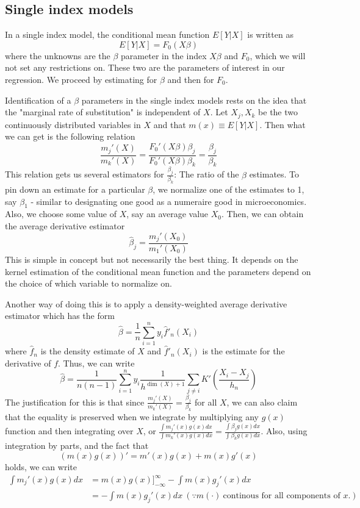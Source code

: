 \documentclass[12pt]{article}
\theoremstyle{definition}
\theoremstyle{property}
\theoremstyle{assumption}
\theoremstyle{example}
\theoremstyle{comment}
\begin{document}
\subsection{Single index models}
In a single index model, the conditional mean function $E[Y|X]$ is written as
\[
E[Y|X]=F_0(X\beta)
\]
where the unknowns are the $\beta$ parameter in the index $X\beta$ and $F_0$, which we will not set any restrictions on. These two are the parameters of interest in our regression. We proceed by estimating for $\beta$ and then for $F_0$. 
\par
Identification of a $\beta$ parameters in the single index models rests on the idea that the "marginal rate of substitution" is independent of $X$. Let $X_j,X_k$ be the two continuously distributed variables in $X$ and that $m(x)\equiv E[Y|X]$. Then what we can get is the following relation
\[
\frac{m_j'(X)}{m_k'(X)} = \frac{F_0'(X\beta)\beta_j}{F_0'(X\beta)\beta_k}=\frac{\beta_j}{\beta_k}
\]
This relation gets us several estimators for $\frac{\beta_j}{\beta_k}$: The ratio of the $\beta$ estimates. To pin down an estimate for a particular $\beta$, we normalize one of the estimates to 1, say $\beta_1$ - similar to designating one good as a numeraire good in microeconomics. Also, we choose some value of $X$, say an average value $X_0$. Then, we can obtain the average derivative estimator
\[
\hat{\beta}_j = \frac{m_j'(X_0)}{m_1'(X_0)}
\]
This is simple in concept but not necessarily the best thing. It depends on the kernel estimation of the conditional mean function and the parameters depend on the choice of which variable to normalize on.
\par
Another way of doing this is to apply a density-weighted average derivative estimator which has the form
\[
\hat{\beta} = \frac{1}{n}\sum_{i=1}^n y_i\hat{f}'_n(X_i)
\]
where $\hat{f}_n$ is the density estimate of $X$ and $\hat{f}'_n(X_i)$ is the estimate for the derivative of $f$. Thus, we can write 
\[
\hat{\beta} = \frac{1}{n(n-1)}\sum_{i=1}^n y_i\frac{1}{h^{\dim(X)+1}} \sum_{j\neq i}K'\left(\frac{X_i-X_j}{h_n}\right)
\]
The justification for this is that since $\frac{m_j'(X)}{m_k'(X)} =\frac{\beta_j}{\beta_k}$ for all $X$, we can also claim that the equality is preserved when we integrate by multiplying any $g(x)$ function and then integrating over $X$, or $\frac{\int m_j'(x)g(x)dx}{\int m_k'(x)g(x)dx}=\frac{\int \beta_jg(x)dx}{\int \beta_kg(x)dx}$. Also, using integration by parts, and the fact that 
\[
(m(x)g(x))'=m'(x)g(x)+m(x)g'(x)
\]
holds, we can write
\[
\begin{aligned}
\int m_j'(x)g(x) dx &= m(x)g(x)]^{\infty}_{-\infty} - \int m(x)g_j'(x)dx \\
&=  - \int m(x)g_j'(x)dx \ (\because m(\cdot) \ \text{continous for all components of $x$.})\\
\end{aligned}
\]
\end{document}

